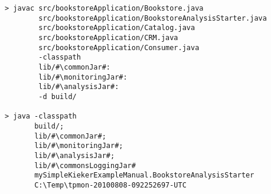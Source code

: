 \begin{lstlisting}[caption=Compile and run under Windows] 			
> javac src/bookstoreApplication/Bookstore.java 
        src/bookstoreApplication/BookstoreAnalysisStarter.java 
        src/bookstoreApplication/Catalog.java 
        src/bookstoreApplication/CRM.java 
        src/bookstoreApplication/Consumer.java
        -classpath
        lib/#\commonJar#:
        lib/#\monitoringJar#:
        lib/#\analysisJar#:
        -d build/

> java -classpath 
       build/;
       lib/#\commonJar#;
       lib/#\monitoringJar#;
       lib/#\analysisJar#;
       lib/#\commonsLoggingJar#
       mySimpleKiekerExampleManual.BookstoreAnalysisStarter 
       C:\Temp\tpmon-20100808-092252697-UTC
\end{lstlisting}	
